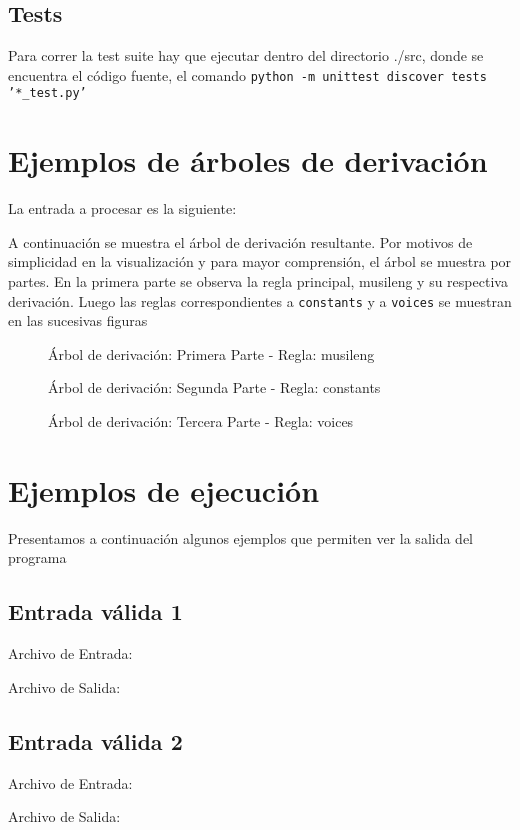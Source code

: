 \documentclass[a4paper,8pt]{article}
\newcommand{\ponerGrafico}[4]
{\begin{figure}[H]
	\centering
	\subfloat{\texttt{[image: \#1]}}
	\caption{#2} \label{fig:#4}
\end{figure}
}
\begin{document}
\subsection{Tests}
Para correr la test suite hay que ejecutar dentro del directorio ./src, donde se encuentra el código fuente, el comando  \texttt{python -m unittest discover tests '*\_test.py'}

\newpage
\section{Ejemplos de árboles de derivación}
La entrada a procesar es la siguiente: 
\begin{small}
  
\end{small}

A continuación se muestra el árbol de derivación resultante. Por motivos de simplicidad en la visualización y para mayor comprensión, el árbol se muestra por partes. En la primera parte se observa la regla principal, musileng y su respectiva derivación. Luego las reglas correspondientes a \texttt{constants} y a \texttt{voices} se muestran en las sucesivas figuras
\ponerGrafico{tree1_musileng.png}{Árbol de derivación: Primera Parte - Regla: musileng}{0.8}{}
\ponerGrafico{tree1_constants.png}{Árbol de derivación: Segunda Parte - Regla: constants}{0.9}{}
\ponerGrafico{tree1_voices.png}{Árbol de derivación: Tercera Parte - Regla: voices}{0.7}{}

\section{Ejemplos de ejecución}
Presentamos a continuación algunos ejemplos que permiten ver la salida del programa
\subsection{Entrada válida 1}
Archivo de Entrada:
\begin{small}
  
\end{small}
Archivo de Salida: 
\begin{small}
  
\end{small}
\subsection{Entrada válida 2}
Archivo de Entrada:
\begin{small}
  
\end{small}
Archivo de Salida: 
\begin{small}
  
\end{small}
\end{document}
